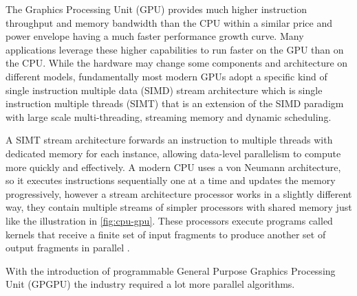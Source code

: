 \documentclass[
  oneside,
  11pt, a4paper,
  footinclude=true,
  headinclude=true,
  cleardoublepage=empty
]{scrbook}
\begin{document}

The Graphics Processing Unit (GPU) provides much higher instruction throughput and memory bandwidth than the CPU within a similar price and power envelope having a much faster performance growth curve. Many applications leverage these higher capabilities to run faster on the GPU than on the CPU. While the hardware may change some components and architecture on different models, fundamentally most modern GPUs adopt a specific kind of single instruction multiple data (SIMD) stream architecture which is single instruction multiple threads (SIMT) that is an extension of the SIMD paradigm with large scale multi-threading, streaming memory and dynamic scheduling. \newline

A SIMT stream architecture forwards an instruction to multiple threads with dedicated memory for each instance, allowing data-level parallelism to compute more quickly and effectively.
A modern CPU uses a von Neumann architecture, so it executes instructions sequentially one at a time and updates the memory progressively, however a stream architecture processor works in a slightly different way, they contain multiple streams of simpler processors with shared memory just like the illustration in \autoref{fig:cpu-gpu}. These processors execute programs called kernels that receive a finite set of input fragments to produce another set of output fragments in parallel \cite{fernando2004gpu}. \newline

With the introduction of programmable General Purpose Graphics Processing Unit (GPGPU) the industry required a lot more parallel algorithms.


\end{document}
